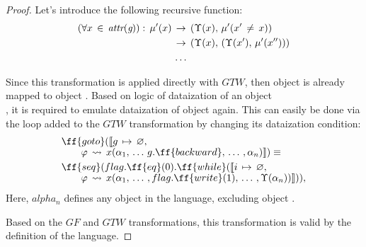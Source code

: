 \documentclass[sigplan,review,11pt,nonacm,natbib=false]{acmart}
\theoremstyle{theorems}
\newcommand\br{\\[-4pt]}
\begin{document}
\begin{proof}
Let's introduce the following recursive function:
\begin{equation}
\begin{split}
(\forall x\,\in\,\emph{attr}(\emph{g})):\,\mu'(x)\,&\rightarrow\,(\Upsilon(x),\,\mu'(x'\,\neq\,x)) \\
        &\rightarrow\,(\Upsilon(x),\,(\Upsilon(x'),\,\mu'(x''))) \\
        &\ldots
\end{split}
\end{equation}

Since this transformation is applied directly with $GTW$, then  object is already mapped to object .
Based on logic of dataization of an object \\
, it is required to emulate dataization of object again.
This can easily be done via the  loop added to the $GTW$ transformation by changing its dataization condition:
\begin{equation}
\begin{split}
& \ff{goto}(\llbracket g\,\mapsto\,\varnothing,\br
& \quad \quad \varphi\,\leadsto\,x(\alpha_1,\,\ldots\,g.\ff{backward},\,\ldots\,,\alpha_n)\rrbracket) \equiv \\
& \ff{seq}(flag.\ff{eq}(0).\ff{while}(\llbracket i\,\mapsto\,\varnothing,\br
& \quad \quad \varphi\,\leadsto\,x(\alpha_1,\,\ldots\,,flag.\ff{write}(1),\,\ldots\,,\Upsilon(\alpha_n))\rrbracket)),\\
\end{split}
\end{equation}
Here, $alpha_n$ defines any object in the language, excluding object .

Based on the $GF$ and $GTW$ transformations, this transformation is valid by the definition of the language.
\end{proof}
\end{document}
